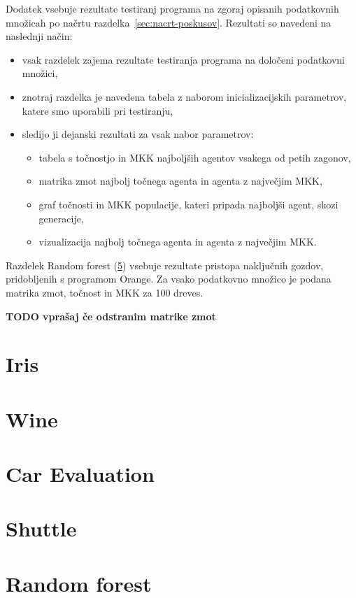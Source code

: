 Dodatek vsebuje rezultate testiranj programa na zgoraj opisanih podatkovnih množicah po načrtu razdelka~\ref{sec:nacrt-poskusov}.
Rezultati so navedeni na naslednji način:
\begin{itemize}
    \item vsak razdelek zajema rezultate testiranja programa na določeni podatkovni množici,
    \item znotraj razdelka je navedena tabela z naborom inicializacijskih parametrov, katere smo uporabili pri testiranju,
    \item sledijo ji dejanski rezultati za vsak nabor parametrov:
    \begin{itemize}
        \item tabela s točnostjo in MKK najboljših agentov vsakega od petih zagonov,
        \item matrika zmot najbolj točnega agenta in agenta z največjim MKK,
        \item graf točnosti in MKK populacije, kateri pripada najboljši agent, skozi generacije,
        \item vizualizacija najbolj točnega agenta in agenta z največjim MKK.
    \end{itemize}
\end{itemize}

Razdelek Random forest (\ref{sec:random-forest-test}) vsebuje rezultate pristopa naključnih gozdov, pridobljenih s programom Orange.
Za vsako podatkovno množico je podana matrika zmot, točnost in MKK za 100 dreves.

\textbf{TODO vprašaj če odstranim matrike zmot}

\section{Iris}\label{sec:dodatek-iris-test}


\section{Wine}\label{sec:dodatek-wine-test}


\section{Car Evaluation}\label{sec:dodatek-car-test}


\section{Shuttle}\label{sec:dodatek-statlog-test}


\section{Random forest}\label{sec:random-forest-test}


